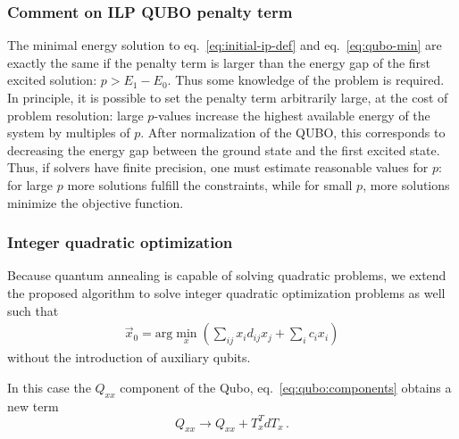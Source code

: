 \documentclass[prd,twocolumn,tightenlines,preprintnumbers,showpacs,superscriptaddress,notitlepage,nofootinbib,eqsecnum,floatfix,longbibliography,aps,10pt]{revtex4-2}
\begin{document}
\subsubsection{Comment on ILP QUBO penalty term}
\label{sec:methods:ilp-qubo-comments}

The minimal energy solution to eq.~\eqref{eq:initial-ip-def} and eq.~\eqref{eq:qubo-min} are exactly the same if the penalty term is larger than the energy gap of the first excited solution: $p > E_1 - E_0$.
Thus some knowledge of the problem is required.
In principle, it is possible to set the penalty term arbitrarily large, at the cost of problem resolution: large $p$-values increase the highest available energy of the system by multiples of $p$.
After normalization of the QUBO, this corresponds to decreasing the energy gap between the ground state and the first excited state.
Thus, if solvers have finite precision, one must estimate reasonable values for $p$: for large $p$ more solutions fulfill the constraints, while for small $p$, more solutions minimize the objective function.

\subsubsection{Integer quadratic optimization}
\label{sec:methods:ilp:quadratic}

Because quantum annealing is capable of solving quadratic problems, we extend the proposed algorithm to solve integer quadratic optimization problems as well such that
\begin{align}
 \vec x_0 = \mathrm{arg}\min\limits_{x}\left(\sum_{ij} x_i d_{ij} x_j + \sum_i c_i x_i\right)
\end{align}
without the introduction of auxiliary qubits.

In this case the $Q_{xx}$ component of the Qubo, eq.~\eqref{eq:qubo:components} obtains a new term
\begin{equation}
    Q_{xx} \to Q_{xx} + T_x^T d T_x \, .
\end{equation}

\end{document}
